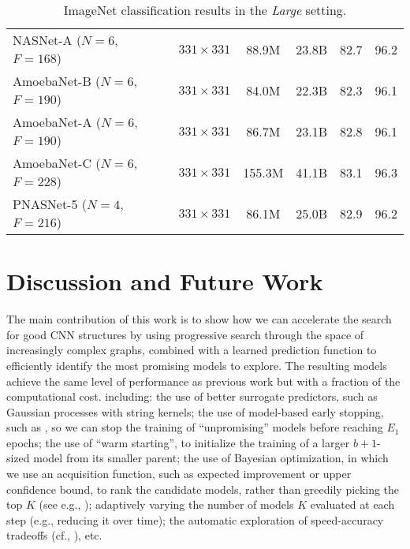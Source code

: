 \documentclass[runningheads]{llncs}
\begin{document}
\begin{table}[t]
\begin{center}
\begin{tabular}{lccccc}
        \midrule
        NASNet-A ($N=6$, $F=168$) \cite{DBLP:journals/corr/ZophVSL17} & $331 \times 331$ & 88.9M & 23.8B & 82.7 & 96.2\\
        AmoebaNet-B ($N=6$, $F=190$) \cite{DBLP:journals/corr/abs-1802-01548} & $331 \times 331$ & 84.0M & 22.3B & 82.3 & 96.1 \\
        AmoebaNet-A ($N=6$, $F=190$) \cite{DBLP:journals/corr/abs-1802-01548} & $331 \times 331$ & 86.7M & 23.1B & 82.8 & 96.1 \\
        AmoebaNet-C ($N=6$, $F=228$) \cite{DBLP:journals/corr/abs-1802-01548} & $331 \times 331$ & 155.3M & 41.1B & 83.1 & 96.3 \\
        \midrule
        PNASNet-5 ($N=4$, $F=216$) & $331 \times 331$ & 86.1M & 25.0B & 82.9 & 96.2 \\
    \bottomrule
    \end{tabular}
\end{center}
\caption{ImageNet classification results in the \textit{Large} setting.}
\label{tab:imagenet-large}
\end{table}

\section{Discussion and Future Work}\label{sec:discuss}

The main contribution of this work is to show how we can accelerate the search for good CNN structures by using progressive search through the space of increasingly complex graphs, combined with a learned prediction function to efficiently identify the most promising models to explore.
The resulting models achieve the same level of performance as previous work but with a fraction of the computational cost.
including:
the use of better surrogate predictors,
such as Gaussian processes with string kernels;
the use of model-based early stopping,
such as 
\cite{Baker2017acc},
so we can stop the training of ``unpromising'' models before reaching $E_1$ epochs;
the use of ``warm starting'', to initialize the training of a larger $b+1$-sized model
 from its smaller parent;
 the use of Bayesian optimization,
in which we use an acquisition function,
such as expected improvement or upper confidence bound,
to rank the candidate models, rather than greedily picking the top $K$
(see e.g., \cite{Snoek2012,Shahriari2016});
adaptively varying the number of models $K$ evaluated at each step (e.g., reducing it over time);
the automatic exploration of speed-accuracy tradeoffs (cf., \cite{PPPnet}),
etc.
\end{document}
